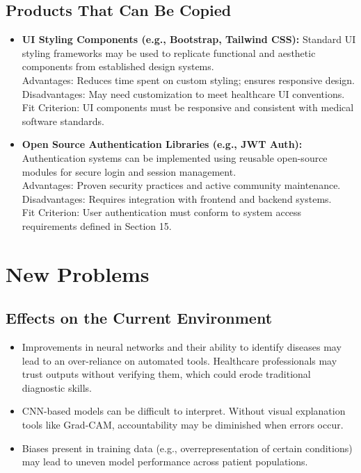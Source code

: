 \documentclass[12pt]{article}
\begin{document}
\subsection{Products That Can Be Copied}
\begin{itemize}
    \item \textbf{UI Styling Components (e.g., Bootstrap, Tailwind CSS):} Standard UI styling frameworks may be used to replicate functional and aesthetic components from established design systems.\\
    Advantages: Reduces time spent on custom styling; ensures responsive design.\\
    Disadvantages: May need customization to meet healthcare UI conventions.\\
    Fit Criterion: UI components must be responsive and consistent with medical software standards.

    \item \textbf{Open Source Authentication Libraries (e.g., JWT Auth):} Authentication systems can be implemented using reusable open-source modules for secure login and session management.\\
    Advantages: Proven security practices and active community maintenance.\\
    Disadvantages: Requires integration with frontend and backend systems.\\
    Fit Criterion: User authentication must conform to system access requirements defined in Section 15.
\end{itemize}

\section{New Problems}

\subsection{Effects on the Current Environment}
\begin{itemize}
    \item Improvements in neural networks and their ability to identify diseases may lead to an over-reliance on automated tools. Healthcare professionals may trust outputs without verifying them, which could erode traditional diagnostic skills.
    \item CNN-based models can be difficult to interpret. Without visual explanation tools like Grad-CAM, accountability may be diminished when errors occur.
    \item Biases present in training data (e.g., overrepresentation of certain conditions) may lead to uneven model performance across patient populations.
\end{itemize}
\end{document}
